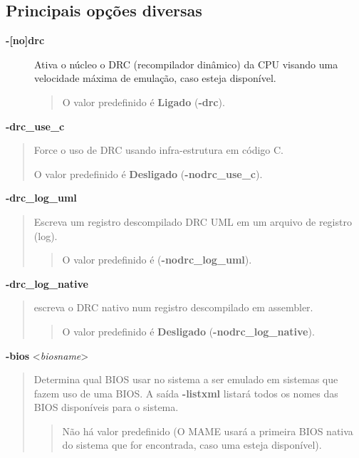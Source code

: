\documentclass[letterpaper,10pt,brazil]{sphinxmanual}
\begin{document}
\subsection{Principais opções diversas}
\label{commandline/commandline-all:principais-opcoes-diversas}\label{commandline/commandline-all:mame-commandline-drc}\begin{description}
\item[{\textbf{-{[}no{]}drc}}] \leavevmode
Ativa o núcleo o DRC (recompilador dinâmico) da CPU visando uma
velocidade máxima de emulação, caso esteja disponível.
\begin{quote}

O valor predefinido é \textbf{Ligado} (\textbf{-drc}).
\end{quote}

\end{description}
\label{commandline/commandline-all:mame-commandline-drcusec}
\textbf{-drc\_use\_c}
\begin{quote}

Force o uso de DRC usando infra-estrutura em código C.

O valor predefinido é \textbf{Desligado} (\textbf{-nodrc\_use\_c}).
\end{quote}
\label{commandline/commandline-all:mame-commandline-drcloguml}
\textbf{-drc\_log\_uml}
\begin{quote}

Escreva um registro descompilado DRC UML em um arquivo de registro
(log).
\begin{quote}

O valor predefinido é (\textbf{-nodrc\_log\_uml}).
\end{quote}
\end{quote}
\label{commandline/commandline-all:mame-commandline-drclognative}
\textbf{-drc\_log\_native}
\begin{quote}

escreva o DRC nativo num registro descompilado em assembler.
\begin{quote}

O valor predefinido é \textbf{Desligado} (\textbf{-nodrc\_log\_native}).
\end{quote}
\end{quote}
\label{commandline/commandline-all:mame-commandline-bios}
\textbf{-bios} \textless{}\emph{biosname}\textgreater{}
\begin{quote}

Determina qual BIOS usar no sistema a ser emulado em sistemas
que fazem uso de uma BIOS. A saída \textbf{-listxml} listará todos os
nomes das BIOS disponíveis para o sistema.
\begin{quote}

Não há valor predefinido (O MAME usará a primeira BIOS nativa
do sistema que for encontrada, caso uma esteja disponível).
\end{quote}
\end{quote}
\end{document}
